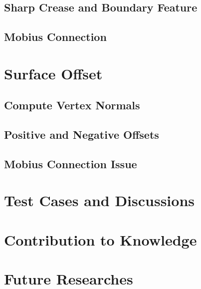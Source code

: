 \documentclass[12pt]{article}
\begin{document}
\subsection{Sharp Crease and Boundary Feature}

\subsection{Mobius Connection}

\section{Surface Offset}

\subsection{Compute Vertex Normals}

\subsection{Positive and Negative Offsets}

\subsection{Mobius Connection Issue}


\section{Test Cases and Discussions}



\section{Contribution to Knowledge}





\section{Future Researches}
\end{document}

